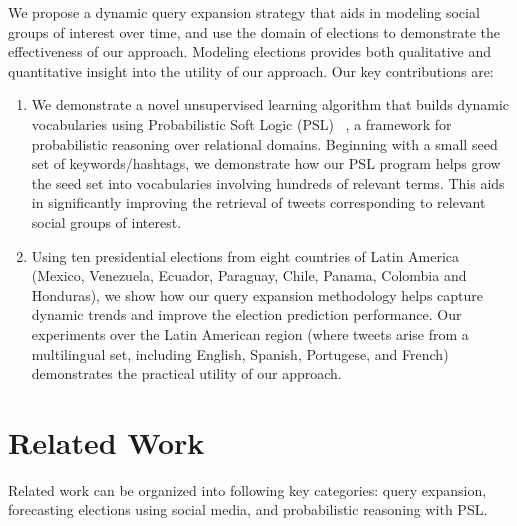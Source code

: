 We propose a dynamic query expansion strategy that aids in modeling social groups of interest over time, and
use the domain of elections to demonstrate the effectiveness of our approach. Modeling elections provides both
qualitative and quantitative insight into the utility of our approach.
Our key contributions are:
\begin{enumerate}
\item We demonstrate
a novel unsupervised learning algorithm that builds dynamic vocabularies using Probabilistic Soft Logic (PSL) ~\cite{kimmig2012short}, a framework for probabilistic reasoning over relational domains.
Beginning with a small seed set of keywords/hashtags, we demonstrate how our PSL program helps
grow the seed set into 
vocabularies involving hundreds of relevant terms. This aids in significantly improving the retrieval of tweets
corresponding to relevant
social groups of interest.
\item Using ten presidential elections from eight countries of Latin America (Mexico, Venezuela, Ecuador, Paraguay, Chile, Panama, Colombia and Honduras), we show how our query expansion methodology helps capture dynamic trends and improve the election prediction performance. Our
experiments over the Latin American region (where tweets
arise from a multilingual set, including English, Spanish, Portugese, and French) demonstrates the practical utility
of our approach.
\begin{comment}
\item In addition to qualitative understanding of social groups, we demonstrate how our approach yields
appreciable improvements to the forecasting of election outcomes. By regressing against opinion polls in each region,
we illustrate how better social group modeling reveals popularities of candidates and their policies.
\end{comment}
\end{enumerate}

\section{Related Work}
Related work can be organized into following key categories: query expansion, forecasting elections using social media,
and probabilistic reasoning with PSL.
\begin{comment}
\reviews{refer\\
Dongsheng Duan, Yuhua Li, Ruixuan Li, Rui Zhang, and Aiming Wen. 2012. RankTopic: Ranking Based Topic Modeling. In Proceedings of the 2012 IEEE 12th International Conference on Data Mining (ICDM 12) [This work also captures relational information] ; Daniel Ramage, Susan T. Dumais, and Daniel J. Liebling. ICWSM, The AAAI Press, (2010); Castella, Quim and Sutton, Charles A Word Storms: Multiples of Word Clouds for Visual Comparison of Documents. CoRR abs/1301.0503 (2013)\\
Lau, Jey Han, Nigel Collier and Timothy Baldwin (2012) On-line Trend Analysis with Topic Models: hashtag twitter trends detection topic model online, In Proceedings of the 24th International Conference on Computational Linguistics (COLING 2012)
}
\end{comment}

